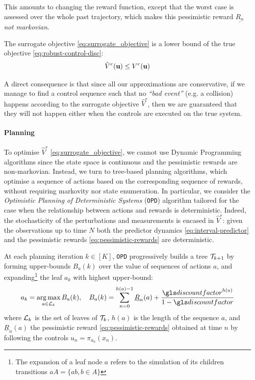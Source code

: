 This amounts to changing the reward function, except that the worst case is assessed over the whole past trajectory, which makes this pessimistic reward $\underline{R_n}$ \emph{not markovian}.

\begin{proposition}
	\label{prop:lower-bound}
	\begin{leftbar}[propositionbar]
	The surrogate objective  \eqref{eq:surrogate_objective} is a lower bound of the true objective  \eqref{eq:robust-control-disc}: 
	\begin{equation*}
	\hat{V}^r(\mathbf{u}) \leq V^r(\mathbf{u})
	\end{equation*}
	\end{leftbar}
\end{proposition}
A direct consequence is that since all our approximations are conservative, if we manage to find a control sequence such that no \textit{``bad event''} (e.g. a collision) happens according to the surrogate objective $\hat{V}^r$, then we are guaranteed that they will not happen either when the controls are executed on the true system. 

\paragraph{Planning}
To optimise $\hat{V}^r$ \eqref{eq:surrogate_objective}, we cannot use Dynamic Programming algorithms since the state space is continuous and the pessimistic rewards are non-markovian. Instead, we turn to tree-based planning algorithms, which optimise a sequence of actions based on the corresponding sequence of rewards, without requiring markovity nor state enumeration. In particular, we consider the \emph{Optimistic Planning of Deterministic Systems} (\texttt{OPD}) algorithm \citep{Hren2008} tailored for the case when the relationship between actions and rewards is deterministic. Indeed, the stochasticity of the perturbations and measurements is encased in $\hat{V}^r$: given the observations up to time $N$ both the predictor dynamics \eqref{eq:interval-predictor} and the pessimistic rewards \eqref{eq:pessimistic-rewards} are deterministic.

At each planning iteration $k\in[K]$, \texttt{OPD} progressively builds a tree $\mathcal{T}_{k+1}$ by forming upper-bounds $B_a(k)$ over the value of sequences of actions $a$, and expanding\footnote{The expansion of a leaf node $a$ refers to the simulation of its children transitions $aA = \{ab, b\in A\}$} the leaf $a_k$ with highest upper-bound:
\begin{equation}
\label{eq:opd}
a_k = \argmax_{a\in\cL_k} B_a(k), \quad B_a(k) = \sum_{n=0}^{h(a)-1} \underline{R}_n(a) + \frac{\discount^{h(a)}}{1-\discount}
\end{equation}
where $\mathcal{L}_k$ is the set of leaves of $\mathcal{T}_k$, $h(a)$ is the length of the sequence $a$, and $\underline{R}_n(a)$ the pessimistic reward \eqref{eq:pessimistic-rewards} obtained at time $n$ by following the controls $u_n = \pi_{a_n}(x_n)$.

